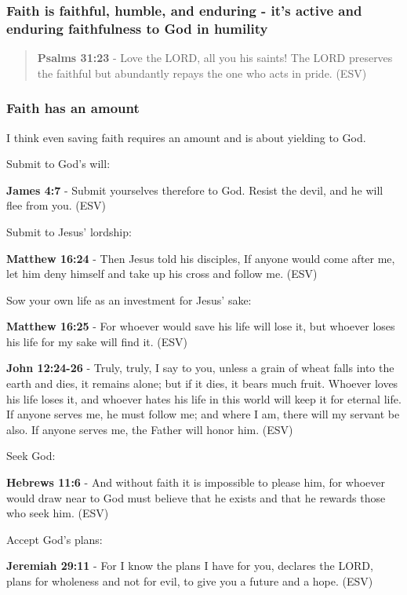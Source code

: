 \documentclass[11pt]{article}
\begin{document}
\subsubsection{Faith is faithful, humble, and enduring - it's active and enduring faithfulness to God in humility}
\label{sec:org3dd919c}
\begin{quote}
\textbf{Psalms 31:23} - Love the LORD, all you his saints! The LORD preserves the faithful but abundantly repays the one who acts in pride. (ESV)
\end{quote}

\subsubsection{Faith has an amount}
\label{sec:orge425ab5}
I think even saving faith requires an amount and is about yielding to God.

Submit to God's will:

\textbf{James 4:7} - Submit yourselves therefore to God. Resist the devil, and he will flee from you. (ESV)

Submit to Jesus' lordship:

\textbf{Matthew 16:24} - Then Jesus told his disciples, If anyone would come after me, let him deny himself and take up his cross and follow me. (ESV)

Sow your own life as an investment for Jesus' sake:

\textbf{Matthew 16:25} - For whoever would save his life will lose it, but whoever loses his life for my sake will find it. (ESV)

\textbf{John 12:24-26} - Truly, truly, I say to you, unless a grain of wheat falls into the earth and dies, it remains alone; but if it dies, it bears much fruit. Whoever loves his life loses it, and whoever hates his life in this world will keep it for eternal life. If anyone serves me, he must follow me; and where I am, there will my servant be also. If anyone serves me, the Father will honor him. (ESV)

Seek God:

\textbf{Hebrews 11:6} - And without faith it is impossible to please him, for whoever would draw near to God must believe that he exists and that he rewards those who seek him. (ESV)

Accept God's plans:

\textbf{Jeremiah 29:11} - For I know the plans I have for you, declares the LORD, plans for wholeness and not for evil, to give you a future and a hope. (ESV)
\end{document}
